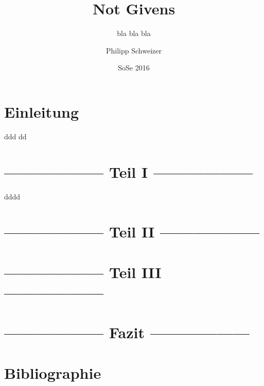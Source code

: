 \documentclass[ngerman,12pt, titlepage, smallheadings, nomath]{scrartcl}
\title{Not Givens}
\subtitle{bla bla bla}
\author{Philipp Schweizer}
\date{SoSe 2016}
\begin{document}
\maketitle

{
\setcounter{tocdepth}{3}
\tableofcontents
}
\newpage

\section{Einleitung}\label{einleitung}

\vspace{-1.25em}

ddd dd

\section{------------------ Teil I ------------------}\label{teil-i}

\vspace{-1.25em}

dddd

\textcite{gedo1979}

\section{------------------ Teil II ------------------}\label{teil-ii}

\vspace{-1.25em}

\section{------------------ Teil III ------------------}\label{teil-iii}

\vspace{-1.25em}

\section{------------------ Fazit ------------------}\label{fazit}

\vspace{-1.25em}

\section*{Bibliographie}\label{bibliographie}

\vspace{-1em}
\end{document}

